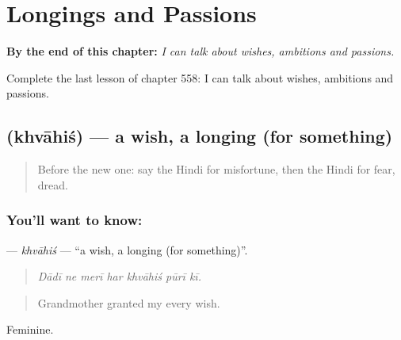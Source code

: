 
\chapter{Longings and Passions}
\label{ch:hi-longings-and-passions}

\begin{chapteropening}
\textbf{By the end of this chapter:} \emph{I can talk about wishes, ambitions and passions.}

Complete the last lesson of chapter 558: I can talk about wishes, ambitions and passions.
\end{chapteropening}

\section[\texorpdfstring{\hi{ख़्वाहिश} (khvāhiś)}{ख़्वाहिश (khvāhiś)}]{ (khvāhiś) — a wish, a longing (for something)}

\label{lesson:HI-C558-khvahis}



\begin{quote}
Before the new one: say the Hindi for misfortune, then the Hindi for fear, dread.
\end{quote}

\subsection*{You'll want to know: }
\textbf{} — \emph{khvāhiś} — \textquotedblleft{}a wish, a longing (for something)\textquotedblright{}.

\begin{quote}
      
\end{quote}

\begin{quote}
\emph{Dādī ne merī har khvāhiś pūrī kī.}
\end{quote}

\begin{quote}
Grandmother granted my every wish.
\end{quote}

Feminine.

